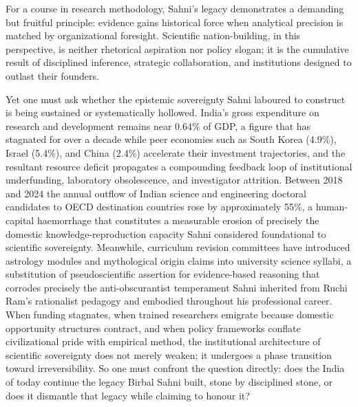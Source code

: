 \documentclass[10pt]{article}
\begin{document}
For a course in research methodology, Sahni's legacy demonstrates a demanding but fruitful principle: evidence gains historical force when analytical precision is matched by organizational foresight. Scientific nation-building, in this perspective, is neither rhetorical aspiration nor policy slogan; it is the cumulative result of disciplined inference, strategic collaboration, and institutions designed to outlast their founders.\cite{science_state_nation,trans_himalayan_article,isti_bsip}

Yet one must ask whether the epistemic sovereignty Sahni laboured to construct is being sustained or systematically hollowed. India's gross expenditure on research and development remains near 0.64\% of GDP, a figure that has stagnated for over a decade while peer economies such as South Korea (4.9\%), Israel (5.4\%), and China (2.4\%) accelerate their investment trajectories, and the resultant resource deficit propagates a compounding feedback loop of institutional underfunding, laboratory obsolescence, and investigator attrition.\cite{dst_rd_stats,nature_brain_drain} Between 2018 and 2024 the annual outflow of Indian science and engineering doctoral candidates to OECD destination countries rose by approximately 55\%, a human-capital haemorrhage that constitutes a measurable erosion of precisely the domestic knowledge-reproduction capacity Sahni considered foundational to scientific sovereignty.\cite{nsf_sed,oecd_migration} Meanwhile, curriculum revision committees have introduced astrology modules and mythological origin claims into university science syllabi,\cite{ugc_astrology,curr_pseudo} a substitution of pseudoscientific assertion for evidence-based reasoning that corrodes precisely the anti-obscurantist temperament Sahni inherited from Ruchi Ram's rationalist pedagogy and embodied throughout his professional career. When funding stagnates, when trained researchers emigrate because domestic opportunity structures contract, and when policy frameworks conflate civilizational pride with empirical method, the institutional architecture of scientific sovereignty does not merely weaken; it undergoes a phase transition toward irreversibility. So one must confront the question directly: does the India of today continue the legacy Birbal Sahni built, stone by disciplined stone, or does it dismantle that legacy while claiming to honour it?
\end{document}
